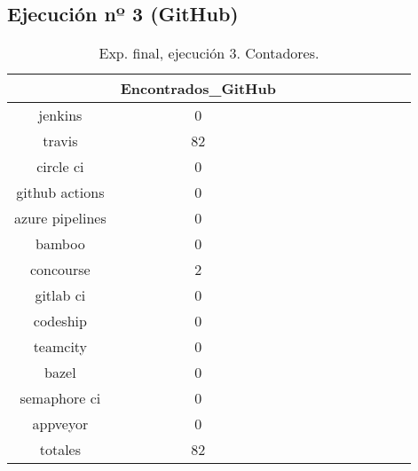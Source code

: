 \begin{table}[h]
\begin{footnotesize}
\begin{tabular}{ccccccccccc}
 \end{tabular}
\end{footnotesize}

\end{table}

\subsection{Ejecución nº 3 (GitHub)}
\begin{table}[h]
  \centering
  \caption{Exp. final, ejecución 3. Contadores.}
  \label{tab:tabla_f_3_1}

\begin{footnotesize}
\renewcommand{\arraystretch}{1.5} %
\begin{tabular}{ccccccccccc}
  \hline
  {} &  Encontrados\_GitHub \\
  \hline
  jenkins         &                   0 \\
  travis          &                  82 \\
  circle ci       &                   0 \\
  github actions  &                   0 \\
  azure pipelines &                   0 \\
  bamboo          &                   0 \\
  concourse       &                   2 \\
  gitlab ci       &                   0 \\
  codeship        &                   0 \\
  teamcity        &                   0 \\
  bazel           &                   0 \\
  semaphore ci    &                   0 \\
  appveyor        &                   0 \\
  totales         &                  82 \\
 \end{tabular}
\end{footnotesize}

\end{table}

